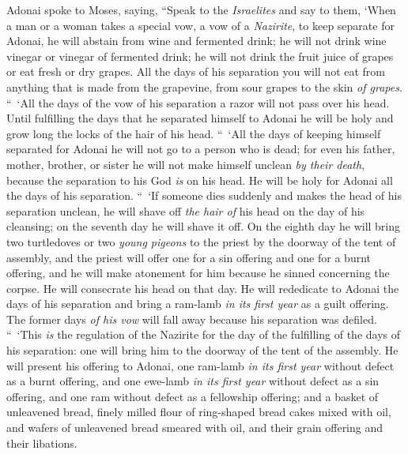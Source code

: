 \begin{biblechapter} %
 Adonai spoke to Moses, saying,
\verse “Speak to the \textit{Israelites} and say to them, ‘When a man or a woman takes a special vow, a vow of a \textit{Nazirite}, to keep separate for Adonai,
\verse he will abstain from wine and fermented drink; he will not drink wine vinegar or vinegar of fermented drink; he will not drink the fruit juice of grapes or eat fresh or dry grapes.
\verse All the days of his separation you will not eat from anything that is made from the grapevine, from sour grapes to the skin \textit{of grapes}.
\verse “ ‘All the days of the vow of his separation a razor will not pass over his head. Until fulfilling the days that he separated himself to Adonai he will be holy and grow long the locks of the hair of his head.
\verse “ ‘All the days of keeping himself separated for Adonai he will not go to a person who is dead;
\verse for even his father, mother, brother, or sister he will not make himself unclean \textit{by their death}, because the separation to his God \textit{is} on his head.
\verse He will be holy for Adonai all the days of his separation.
\verse “ ‘If someone dies suddenly and makes the head of his separation unclean, he will shave off \textit{the hair of} his head on the day of his cleansing; on the seventh day he will shave it off.
\verse On the eighth day he will bring two turtledoves or two \textit{young pigeons} to the priest by the doorway of the tent of assembly,
\verse and the priest will offer one for a sin offering and one for a burnt offering, and he will make atonement for him because he sinned concerning the corpse. He will consecrate his head on that day.
\verse He will rededicate to Adonai the days of his separation and bring a ram-lamb \textit{in its first year} as a guilt offering. The former days \textit{of his vow} will fall away because his separation was defiled.
\verse “ ‘This \textit{is} the regulation of the Nazirite for the day of the fulfilling of the days of his separation: one will bring him to the doorway of the tent of the assembly.
\verse He will present his offering to Adonai, one ram-lamb \textit{in its first year} without defect as a burnt offering, and one ewe-lamb \textit{in its first year} without defect as a sin offering, and one ram without defect as a fellowship offering;
\verse and a basket of unleavened bread, finely milled flour of ring-shaped bread cakes mixed with oil, and wafers of unleavened bread smeared with oil, and their grain offering and their libations.

\end{biblechapter}
